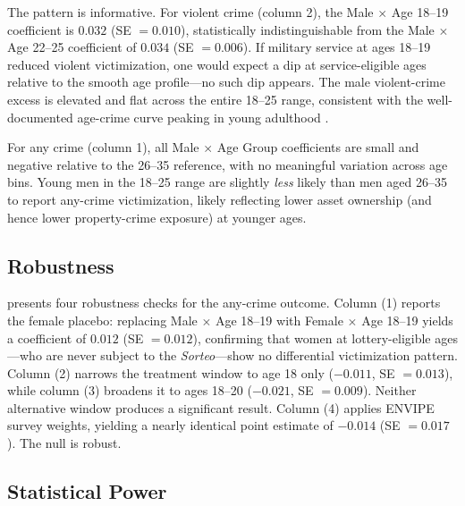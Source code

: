 \documentclass[12pt]{article}
\begin{document}
The pattern is informative. For violent crime (column 2), the Male $\times$ Age 18--19 coefficient is $0.032$ (SE $= 0.010$), statistically indistinguishable from the Male $\times$ Age 22--25 coefficient of $0.034$ (SE $= 0.006$). If military service at ages 18--19 reduced violent victimization, one would expect a dip at service-eligible ages relative to the smooth age profile---no such dip appears. The male violent-crime excess is elevated and flat across the entire 18--25 range, consistent with the well-documented age-crime curve peaking in young adulthood \citep{becker1968crime, lochner2004effect}.

For any crime (column 1), all Male $\times$ Age Group coefficients are small and negative relative to the 26--35 reference, with no meaningful variation across age bins. Young men in the 18--25 range are slightly \textit{less} likely than men aged 26--35 to report any-crime victimization, likely reflecting lower asset ownership (and hence lower property-crime exposure) at younger ages.



\subsection{Robustness}

 presents four robustness checks for the any-crime outcome. Column (1) reports the female placebo: replacing Male $\times$ Age 18--19 with Female $\times$ Age 18--19 yields a coefficient of $0.012$ (SE $= 0.012$), confirming that women at lottery-eligible ages---who are never subject to the \textit{Sorteo}---show no differential victimization pattern. Column (2) narrows the treatment window to age 18 only ($-0.011$, SE $= 0.013$), while column (3) broadens it to ages 18--20 ($-0.021$, SE $= 0.009$). Neither alternative window produces a significant result. Column (4) applies ENVIPE survey weights, yielding a nearly identical point estimate of $-0.014$ (SE $= 0.017$). The null is robust.



\subsection{Statistical Power}
\end{document}
